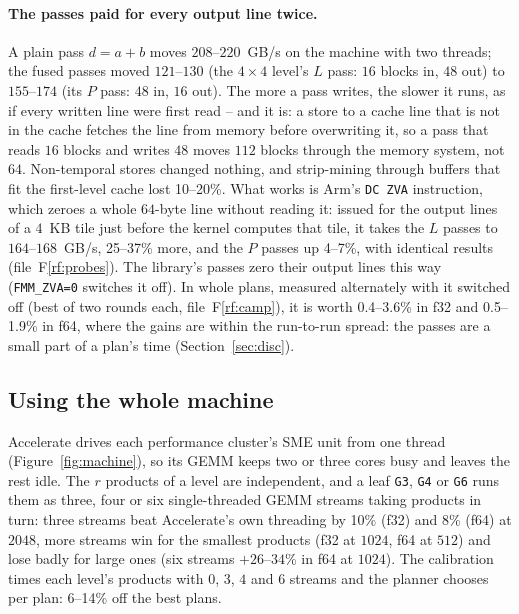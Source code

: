 \documentclass[11pt]{article}
\newcommand{\rf}[1]{F\ref{rf:#1}}
\newcommand{\lv}[1]{\texttt{#1}}
\begin{document}
\paragraph{The passes paid for every output line twice.}
A plain pass $d=a+b$ moves $208$--$220$~GB/s on the machine with two
threads; the fused passes moved $121$--$130$ (the $4\times4$ level's $L$
pass: $16$ blocks in, $48$ out) to $155$--$174$ (its $P$ pass: $48$ in, $16$
out).  The more a pass writes, the slower it runs, as if every written line
were first read -- and it is: a store to a cache line that is not in the cache
fetches the line from memory before overwriting it, so a pass that reads $16$
blocks and writes $48$ moves $112$ blocks through the memory system, not $64$.
Non-temporal stores changed nothing, and strip-mining through buffers that fit
the first-level cache lost 10--20\%.  What works is Arm's \texttt{DC~ZVA}
instruction, which zeroes a whole $64$-byte line without reading it: issued for
the output lines of a $4$~KB tile just before the kernel computes that tile, it
takes the $L$ passes to $164$--$168$~GB/s, 25--37\% more, and the $P$ passes up
4--7\%, with identical results (file~\rf{probes}).
The library's passes zero their output lines this way (\texttt{FMM\_ZVA=0}
switches it off).  In whole plans, measured alternately with it switched off
(best of two rounds each, file~\rf{camp}), it
is worth 0.4--3.6\% in f32 and 0.5--1.9\% in f64, where the gains are
within the run-to-run spread: the passes are a small part of a plan's time
(Section~\ref{sec:disc}).

\subsection{Using the whole machine}\label{sec:machine}

Accelerate drives each performance cluster's SME unit from one thread
(Figure~\ref{fig:machine}), so its
GEMM keeps two or three cores busy and leaves the rest idle.  The $r$ products
of a level are independent, and a leaf \lv{G3}, \lv{G4} or \lv{G6} runs them
as three, four or six single-threaded GEMM streams taking products in turn: three streams beat
Accelerate's own threading by 10\% (f32) and 8\% (f64) at $2048$, more streams
win for the smallest products (f32 at $1024$, f64 at $512$) and lose badly
for large ones (six streams $+26$--$34$\% in f64 at $1024$).  The calibration
times each level's products with $0$, $3$, $4$ and $6$ streams and the
planner chooses per plan: 6--14\% off the best plans.
\end{document}
